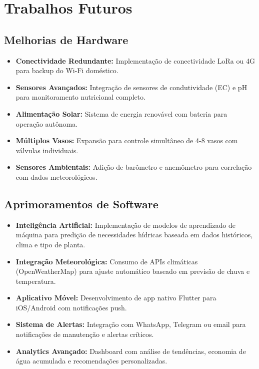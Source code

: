 \documentclass[twoside,english,brazilian]{UNISINOSmonografia}
\begin{document}
\section{Trabalhos Futuros}

\subsection{Melhorias de Hardware}
\begin{itemize}
    \item \textbf{Conectividade Redundante:} Implementação de conectividade LoRa ou 4G para backup do Wi-Fi doméstico.
    \item \textbf{Sensores Avançados:} Integração de sensores de condutividade (EC) e pH para monitoramento nutricional completo.
    \item \textbf{Alimentação Solar:} Sistema de energia renovável com bateria para operação autônoma.
    \item \textbf{Múltiplos Vasos:} Expansão para controle simultâneo de 4-8 vasos com válvulas individuais.
    \item \textbf{Sensores Ambientais:} Adição de barômetro e anemômetro para correlação com dados meteorológicos.
\end{itemize}

\subsection{Aprimoramentos de Software}
\begin{itemize}
    \item \textbf{Inteligência Artificial:} Implementação de modelos de aprendizado de máquina para predição de necessidades hídricas baseada em dados históricos, clima e tipo de planta.
    \item \textbf{Integração Meteorológica:} Consumo de APIs climáticas (OpenWeatherMap) para ajuste automático baseado em previsão de chuva e temperatura.
    \item \textbf{Aplicativo Móvel:} Desenvolvimento de app nativo Flutter para iOS/Android com notificações push.
    \item \textbf{Sistema de Alertas:} Integração com WhatsApp, Telegram ou email para notificações de manutenção e alertas críticos.
    \item \textbf{Analytics Avançado:} Dashboard com análise de tendências, economia de água acumulada e recomendações personalizadas.
\end{itemize}
\end{document}
